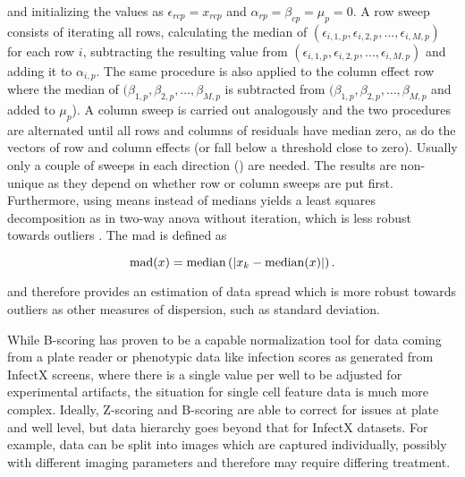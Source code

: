 and initializing the values as $\epsilon_{rcp} = x_{rcp}$ and $\alpha_{rp} = \beta_{cp} = \mu_p = 0$. A row sweep consists of iterating all rows, calculating the median of $(\epsilon_{i,1,p}, \epsilon_{i,2,p}, \dotsc, \epsilon_{i,M,p})$ for each row $i$, subtracting the resulting value from $(\epsilon_{i,1,p}, \epsilon_{i,2,p}, \dotsc, \epsilon_{i,M,p})$ and adding it to $\alpha_{i,p}$. The same procedure is also applied to the column effect row where the median of $(\beta_{1,p}, \beta_{2,p}, \dotsc, \beta_{M,p}$ is subtracted from $(\beta_{1,p}, \beta_{2,p}, \dotsc, \beta_{M,p}$ and added to $\mu_p$). A column sweep is carried out analogously and the two procedures are alternated until all rows and columns of residuals have median zero, as do the vectors of row and column effects (or fall below a threshold close to zero). Usually only a couple of sweeps in each direction () are needed. The results are non-unique as they depend on whether row or column sweeps are put first. Furthermore, using means instead of medians yields a least squares decomposition as in two-way \gls{anova} without iteration, which is less robust towards outliers \citep{Brown2006,Venables2002}. The \gls{mad} is defined as

\begin{equation}
  \operatorname{mad}(x) = \operatorname{median}\left(\lvert x_k-\operatorname{median}(x)\rvert\right).
\end{equation}

and therefore provides an estimation of data spread which is more robust towards outliers as other measures of dispersion, such as standard deviation.

While B-scoring has proven to be a capable normalization tool for data coming from a plate reader or phenotypic data like infection scores as generated from InfectX screens, where there is a single value per well to be adjusted for experimental artifacts, the situation for single cell feature data is much more complex. Ideally, Z-scoring and B-scoring are able to correct for issues at plate and well level, but data hierarchy goes beyond that for InfectX datasets. For example, data can be split into images which are captured individually, possibly with different imaging parameters and therefore may require differing treatment.


